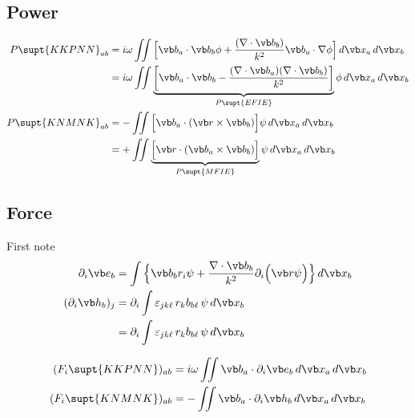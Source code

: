\subsection*{Power}
\begin{align*}
 P\supt{KKPNN}_{ab} 
 &= i\omega \iint \Big[ \vb b_a \cdot \vb b_b \phi
                + \frac{(\nabla \cdot \vb b_b)}{k^2}
                  \vb b_a \cdot \nabla\phi \Big]
\,d\vb x_a \, d\vb x_b
\\
 &= i\omega 
    \iint \underbrace{\bigg[ \vb b_a \cdot \vb b_b 
               - \frac{(\nabla \cdot \vb b_a)(\nabla \cdot \vb b_b)}{k^2}
                      \bigg]
                     }_{P\supt{EFIE}} \phi
\,d\vb x_a \, d\vb x_b
\\
 P\supt{KNMNK}_{ab} 
 &=-\iint \Big[ \vb b_a \cdot (\vb r \times \vb b_b)\Big]\psi 
                \,d\vb x_a \, d\vb x_b
\\
 &=+\iint \underbrace{
          \Big[ \vb r \cdot (\vb b_a \times \vb b_b)\Big]
                     }_{P\supt{MFIE}}\psi
                \,d\vb x_a \, d\vb x_b
\\
\end{align*}

\subsection*{Force}

First note 
\begin{align*}
  \partial_i \vb e_b &=
  \int \Big\{ \vb b_b r_i \psi +
              \frac{\nabla\cdot \vb b_b}{k^2}\partial_i\Big(\vb r\psi\Big)
       \Big\}\, d\vb x_b
\\
  (\partial_i \vb h_b)_j
&=\partial_i \int \varepsilon_{jk\ell} \, r_k b_{b\ell} \, \psi \, d\vb x_b
\\
&=\partial_i \int \varepsilon_{jk\ell} \, r_k b_{b\ell} \, \psi \, d\vb x_b
\end{align*}

\begin{align*}
 (F_i\supt{KKPNN})_{ab} 
 &= i\omega \iint \vb b_a \cdot \partial_i \vb e_b \,d\vb x_a \, d\vb x_b
\\
 (F_i\supt{KNMNK})_{ab} 
 &= -\iint \vb b_a \cdot \partial_i \vb h_b \, d\vb x_a \, d\vb x_b
\end{align*}

